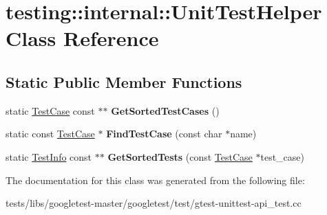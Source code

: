 \hypertarget{classtesting_1_1internal_1_1UnitTestHelper}{}\section{testing\+:\+:internal\+:\+:Unit\+Test\+Helper Class Reference}
\label{classtesting_1_1internal_1_1UnitTestHelper}
\subsection*{Static Public Member Functions}
\begin{DoxyCompactItemize}
\item 
\mbox{\label{classtesting_1_1internal_1_1UnitTestHelper_a9a549307062083d10358638af272cc98}} 
static \hyperlink{classtesting_1_1TestCase}{Test\+Case} const  $\ast$$\ast$ {\bfseries Get\+Sorted\+Test\+Cases} ()
\item 
\mbox{\label{classtesting_1_1internal_1_1UnitTestHelper_a46303cbb7a6abb456f7b1350542113ac}} 
static const \hyperlink{classtesting_1_1TestCase}{Test\+Case} $\ast$ {\bfseries Find\+Test\+Case} (const char $\ast$name)
\item 
\mbox{\label{classtesting_1_1internal_1_1UnitTestHelper_a02602d22fb74566dad78c0c9d4f24e78}} 
static \hyperlink{classtesting_1_1TestInfo}{Test\+Info} const  $\ast$$\ast$ {\bfseries Get\+Sorted\+Tests} (const \hyperlink{classtesting_1_1TestCase}{Test\+Case} $\ast$test\+\_\+case)
\end{DoxyCompactItemize}


The documentation for this class was generated from the following file\+:\begin{DoxyCompactItemize}
\item 
tests/libs/googletest-\/master/googletest/test/gtest-\/unittest-\/api\+\_\+test.\+cc\end{DoxyCompactItemize}

